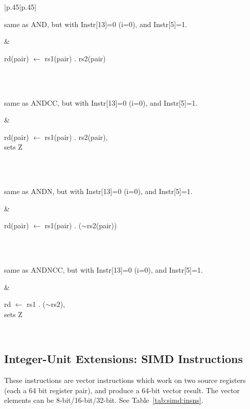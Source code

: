 \begin{table}[p]
\begin{tabular}[p]{|p{.45\textwidth}|p{.45\textwidth}|}
 \hline 
 \parbox{\linewidth}{		  same as AND, but with Instr[13]=0 (i=0), and Instr[5]=1.} & 
 \parbox{\linewidth}{		rd(pair) $\leftarrow$ rs1(pair) . rs2(pair)}\\
\hline
\hline
{} \\ 
 \hline 
 \parbox{\linewidth}{		  same as ANDCC, but with Instr[13]=0 (i=0), and Instr[5]=1.} & 
 \parbox{\linewidth}{		rd(pair) $\leftarrow$ rs1(pair) . rs2(pair),\\ sets Z}\\
\hline
\hline
{} \\ 
 \hline 
 \parbox{\linewidth}{		  same as ANDN, but with Instr[13]=0 (i=0), and Instr[5]=1.} & 
 \parbox{\linewidth}{		rd(pair) $\leftarrow$ rs1(pair) . ($\sim$rs2(pair))}\\
\hline
\hline
{} \\ 
 \hline 
 \parbox{\linewidth}{		  same as ANDNCC, but with Instr[13]=0 (i=0), and Instr[5]=1.} & 
 \parbox{\linewidth}{		rd $\leftarrow$ rs1 . ($\sim$rs2),\\ sets Z}\\
\hline
  \end{tabular}
  \caption{64 bit Logical Instructions}
  \label{tab:64bit:logical:insns}
\end{table}

\subsection{Integer-Unit Extensions: SIMD Instructions}
\label{sec:integer-unit-extns:simd-instructions}

These instructions  are vector instructions  which work on  two source
registers (each a  64 bit register pair), and produce  a 64-bit vector
result.   The   vector  elements  can  be   8-bit/16-bit/32-bit.   See
Table~\ref{tab:simd:insns}.

